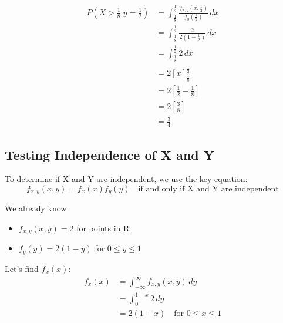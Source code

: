 \documentclass{article}
\begin{document}
       \begin{align*}
           P(X > \frac{1}{8} | y = \frac{1}{2}) &= \int_{\frac{1}{8}}^{\frac{1}{2}} \frac{f_{x,y}(x,\frac{1}{2})}{f_y(\frac{1}{2})} \, dx \\
           &= \int_{\frac{1}{8}}^{\frac{1}{2}} \frac{2}{2(1-\frac{1}{2})} \, dx \\
           &= \int_{\frac{1}{8}}^{\frac{1}{2}} 2 \, dx \\
           &= 2\left[x\right]_{\frac{1}{8}}^{\frac{1}{2}} \\
           &= 2\left[\frac{1}{2} - \frac{1}{8}\right] \\
           &= 2\left[\frac{3}{8}\right] \\
           &= \frac{3}{4}
       \end{align*}


       \subsection*{Testing Independence of X and Y}
       
       To determine if X and Y are independent, we use the key equation:
       \[f_{x,y}(x,y) = f_x(x)f_y(y) \quad \text{if and only if X and Y are independent}\]
       
       We already know:
       \begin{itemize}
           \item $f_{x,y}(x,y) = 2$ for points in R
           \item $f_y(y) = 2(1-y)$ for $0 \leq y \leq 1$
       \end{itemize}
       
       Let's find $f_x(x)$:
       \begin{align*}
           f_x(x) &= \int_{-\infty}^{\infty} f_{x,y}(x,y) \, dy \\
                  &= \int_{0}^{1-x} 2 \, dy \\
                  &= 2(1-x) \quad \text{for } 0 \leq x \leq 1
       \end{align*}
\end{document}
